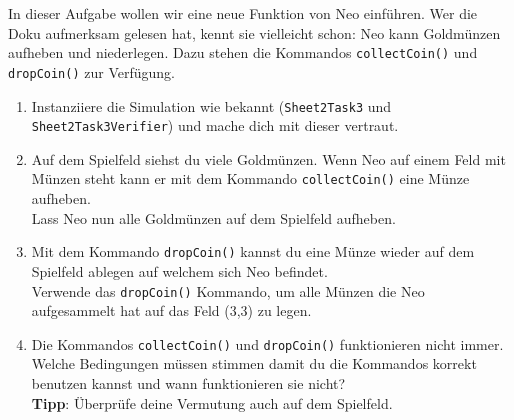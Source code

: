 

In dieser Aufgabe wollen wir eine neue Funktion von Neo einführen. 
Wer die Doku aufmerksam gelesen hat, kennt sie vielleicht schon:
Neo kann Goldmünzen aufheben und niederlegen. 
Dazu stehen die Kommandos \lstinline{collectCoin()} und \lstinline{dropCoin()} zur Verfügung.

\begin{enumerate}
    \item Instanziiere die Simulation wie bekannt (\lstinline{Sheet2Task3} und \lstinline{Sheet2Task3Verifier}) und mache dich mit dieser vertraut.
    \item Auf dem Spielfeld siehst du viele Goldmünzen.
        Wenn Neo auf einem Feld mit Münzen steht kann er mit dem Kommando \lstinline{collectCoin()} eine Münze aufheben.\\
        Lass Neo nun alle Goldmünzen auf dem Spielfeld aufheben.
    \item Mit dem Kommando \lstinline{dropCoin()} kannst du eine Münze wieder auf dem Spielfeld ablegen auf welchem sich Neo befindet.\\
        Verwende das \lstinline{dropCoin()} Kommando, um alle Münzen die Neo aufgesammelt hat auf das Feld (3,3) zu legen.
    \item Die Kommandos \lstinline{collectCoin()} und \lstinline{dropCoin()} funktionieren nicht immer.
        Welche Bedingungen müssen stimmen damit du die Kommandos korrekt benutzen kannst und wann funktionieren sie nicht?\\
        \textbf{Tipp}: Überprüfe deine Vermutung auch auf dem Spielfeld.\\
\end{enumerate}



